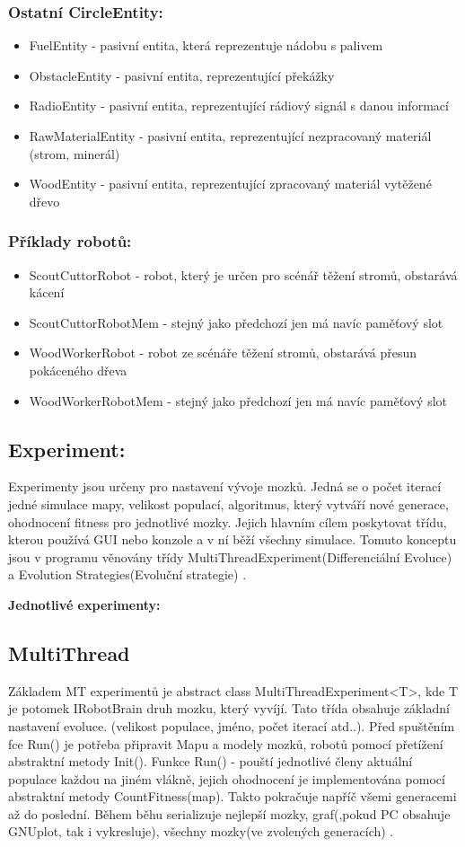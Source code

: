 \subsubsection{Ostatní CircleEntity: }
\begin{itemize}
\item FuelEntity - pasivní entita, která reprezentuje nádobu s palivem
\item ObstacleEntity - pasivní entita, reprezentující překážky
\item  RadioEntity  - pasivní entita, reprezentující rádiový signál s danou informací 
\item  RawMaterialEntity - pasivní entita, reprezentující nezpracovaný materiál (strom, minerál) 
\item  WoodEntity - pasivní entita, reprezentující zpracovaný materiál vytěžené dřevo
\end{itemize}
\subsubsection{Příklady robotů:}
\begin{itemize}
\item ScoutCuttorRobot - robot, který je určen pro scénář těžení stromů, obstarává kácení
\item ScoutCuttorRobotMem -  stejný jako předchozí jen má navíc paměťový slot
\item WoodWorkerRobot - robot ze scénáře těžení stromů, obstarává přesun pokáceného dřeva 
\item WoodWorkerRobotMem - stejný jako předchozí jen má navíc paměťový slot
\end{itemize}
\newpage 
\subsection{Experiment:}
Experimenty jsou určeny pro nastavení vývoje mozků. Jedná se o počet iterací jedné simulace mapy, velikost populací, algoritmus, který vytváří nové generace, ohodnocení fitness pro jednotlivé mozky. Jejich hlavním cílem poskytovat třídu, kterou používá GUI nebo konzole a v ní běží všechny simulace. Tomuto konceptu jsou v programu věnovány třídy MultiThreadExperiment(Differenciální Evoluce) a Evolution Strategies(Evoluční strategie) . \par
\textbf{Jednotlivé experimenty:} \par
\subsection{MultiThread}
Základem MT experimentů je abstract class MultiThreadExperiment<T>, kde T je potomek IRobotBrain druh mozku, který vyvíjí. Tato třída obsahuje základní nastavení evoluce. (velikost populace, jméno, počet iterací atd..). Před spuštěním fce Run() je potřeba připravit Mapu a modely mozků, robotů pomocí přetížení abstraktní metody Init(). Funkce Run() - pouští jednotlivé členy aktuální populace každou na jiném vlákně, jejich ohodnocení je implementována pomocí abstraktní metody CountFitness(map). Takto pokračuje napříč všemi generacemi až do poslední. Během běhu serializuje nejlepší mozky, graf(,pokud PC obsahuje GNUplot, tak i vykresluje), všechny mozky(ve zvolených generacích) . \\
